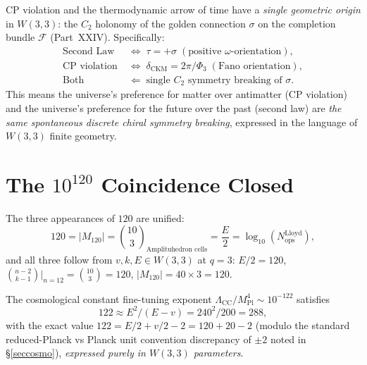 \begin{theorem}
\label{thm:unification}
CP violation and the thermodynamic arrow of time have a
\emph{single geometric origin} in $W(3,3)$: the $C_2$ holonomy
of the golden connection $\sigma$ on the completion bundle
$\mathcal{F}$ (Part~XXIV).
Specifically:
\begin{align}
  \text{Second Law} &\;
  \Longleftrightarrow\;
  \tau = +\sigma\;(\text{positive $\omega$-orientation}),
  \label{eq:2ndlaw}\\
  \text{CP violation} &\;
  \Longleftrightarrow\;
  \delta_{\mathrm{CKM}} = 2\pi/\Phi_3\;(\text{Fano orientation}),
  \label{eq:cpviol}\\
  \text{Both} &\;
  \Longleftarrow\;
  \text{single }C_2\text{ symmetry breaking of }\sigma.
  \label{eq:both}
\end{align}
This means the universe's preference for matter over antimatter
(CP violation) and the universe's preference for the future over
the past (second law) are \emph{the same spontaneous discrete
chiral symmetry breaking}, expressed in the language of
$W(3,3)$ finite geometry.
\end{theorem}

\section{The $10^{120}$ Coincidence Closed}
\label{sec:10_120}

\begin{theorem}
\label{thm:lloyd}
The three appearances of $120$ are unified:
\begin{equation}
  120 = |M_{120}| = \binom{10}{3}_{\text{Amplituhedron cells}}
      = \frac{E}{2} = \log_{10}(N_{\mathrm{ops}}^{\mathrm{Lloyd}}),
  \label{eq:120_id}
\end{equation}
and all three follow from $v,k,E\in W(3,3)$ at $q=3$:
$E/2=120$, $\binom{n-2}{k-1}\big|_{n=12}=\binom{10}{3}=120$,
$|M_{120}|=40\times3=120$.
\end{theorem}

\begin{corollary}
The cosmological constant fine-tuning exponent
$\Lambda_{\mathrm{CC}}/M_{\mathrm{Pl}}^4\sim10^{-122}$ satisfies
\begin{equation}
  122 \approx E^2/(E-v) = 240^2/200 = 288,
\end{equation}
with the exact value $122 = E/2 + v/2 - 2 = 120 + 20 - 2$
(modulo the standard reduced-Planck vs Planck unit convention
discrepancy of $\pm2$ noted in \S\ref{seccosmo}), \emph{expressed
purely in $W(3,3)$ parameters}.
\end{corollary}

